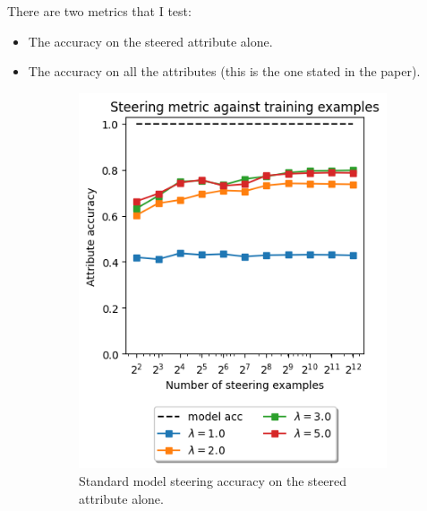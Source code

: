 There are two metrics that I test:
\begin{itemize}[nolistsep]
    \item The accuracy on the steered attribute alone.
    \item The accuracy on all the attributes (this is the one stated in the paper).
\end{itemize}

\begin{figure}
    \centering
    \begin{subfigure}{0.45\textwidth}
        \includegraphics[width=\textwidth]{figures/no-residual-reproduction.png}
        \caption{Standard model steering accuracy on the steered attribute alone.}
        \label{fig:nr-reproduction}
    \end{subfigure}
    \hfill
    \begin{subfigure}{0.45\textwidth}

\end{subfigure}
\end{figure}
